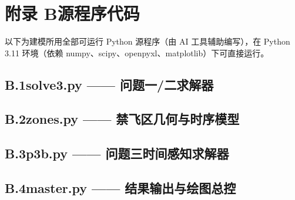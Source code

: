 \documentclass[12pt,a4paper]{ctexart}
\begin{document}
\section*{附录 B\quad 源程序代码}

以下为建模所用全部可运行 Python 源程序（由 AI 工具辅助编写），在 Python 3.11 环境（依赖 numpy、scipy、openpyxl、matplotlib）下可直接运行。

\subsection*{B.1\quad solve3.py —— 问题一/二求解器}


\subsection*{B.2\quad zones.py —— 禁飞区几何与时序模型}


\subsection*{B.3\quad p3b.py —— 问题三时间感知求解器}


\subsection*{B.4\quad master.py —— 结果输出与绘图总控}

\end{document}
